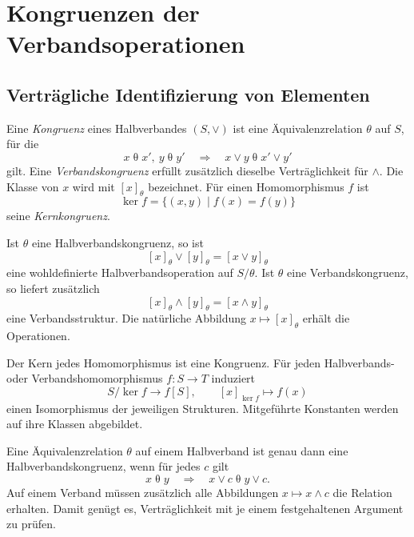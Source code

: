 \chapter{Kongruenzen der Verbandsoperationen}
\label{b45guide:ch:congruences}

\section{Verträgliche Identifizierung von Elementen}

\begin{definition}
\label{b45guide:def:congruence}
Eine \emph{Kongruenz} eines Halbverbandes $(S,\vee)$ ist eine
Äquivalenzrelation $\theta$ auf $S$, für die
\[
 x\mathrel\theta x',\ y\mathrel\theta y'
 \quad\Longrightarrow\quad
 x\vee y\mathrel\theta x'\vee y'
\]
gilt. Eine \emph{Verbandskongruenz} erfüllt zusätzlich dieselbe
Verträglichkeit für $\wedge$.
Die Klasse von $x$ wird mit $[x]_\theta$ bezeichnet.
Für einen Homomorphismus $f$ ist
\[
 \ker f=\{(x,y)\mid f(x)=f(y)\}
\]
seine \emph{Kernkongruenz}.
\end{definition}

\begin{theorem}
\label{b45guide:thm:quotient}
Ist $\theta$ eine Halbverbandskongruenz, so ist
\[
 [x]_\theta\vee[y]_\theta=[x\vee y]_\theta
\]
eine wohldefinierte Halbverbandsoperation auf $S/\theta$.
Ist $\theta$ eine Verbandskongruenz, so liefert zusätzlich
\[
 [x]_\theta\wedge[y]_\theta=[x\wedge y]_\theta
\]
eine Verbandsstruktur. Die natürliche Abbildung $x\mapsto[x]_\theta$
erhält die Operationen.

Der Kern jedes Homomorphismus ist eine Kongruenz. Für jeden
Halbverbands- oder Verbandshomomorphismus $f:S\to T$ induziert
\[
 S/\ker f\longrightarrow f[S],\qquad [x]_{\ker f}\longmapsto f(x)
\]
einen Isomorphismus der jeweiligen Strukturen.
Mitgeführte Konstanten werden auf ihre Klassen abgebildet. \cite{nation-con}
\end{theorem}

\begin{theorem}
\label{b45guide:thm:translations}
Eine Äquivalenzrelation $\theta$ auf einem Halbverband ist genau
dann eine Halbverbandskongruenz, wenn für jedes $c$ gilt
\[
 x\mathrel\theta y\quad\Longrightarrow\quad
 x\vee c\mathrel\theta y\vee c.
\]
Auf einem Verband müssen zusätzlich alle Abbildungen
$x\mapsto x\wedge c$ die Relation erhalten.
Damit genügt es, Verträglichkeit mit je einem festgehaltenen
Argument zu prüfen.
\end{theorem}

